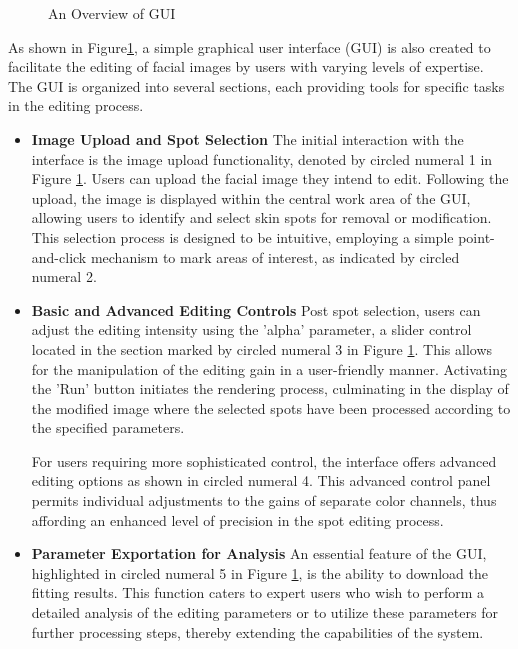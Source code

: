 \begin{spacing}{1.5}
\begin{figure}[t!]
    \caption{An Overview of GUI}
    \label{fig:gui}
\end{figure}
As shown in Figure\ref{fig:gui}, a simple graphical user interface (GUI) is also created to facilitate the editing of facial images by users with varying levels of expertise. The GUI is organized into several sections, each providing tools for specific tasks in the editing process.
\begin{itemize}
    \item \textbf{Image Upload and Spot Selection} The initial interaction with the interface is the image upload functionality, denoted by circled numeral 1 in Figure \ref{fig:gui}. Users can upload the facial image they intend to edit. Following the upload, the image is displayed within the central work area of the GUI, allowing users to identify and select skin spots for removal or modification. This selection process is designed to be intuitive, employing a simple point-and-click mechanism to mark areas of interest, as indicated by circled numeral 2.
    \item \textbf{Basic and Advanced Editing Controls} Post spot selection, users can adjust the editing intensity using the 'alpha' parameter, a slider control located in the section marked by circled numeral 3 in Figure \ref{fig:gui}. This allows for the manipulation of the editing gain in a user-friendly manner. Activating the 'Run' button initiates the rendering process, culminating in the display of the modified image where the selected spots have been processed according to the specified parameters.

    For users requiring more sophisticated control, the interface offers advanced editing options as shown in circled numeral 4. This advanced control panel permits individual adjustments to the gains of separate color channels, thus affording an enhanced level of precision in the spot editing process.
    \item \textbf{Parameter Exportation for Analysis} An essential feature of the GUI, highlighted in circled numeral 5 in Figure \ref{fig:gui}, is the ability to download the fitting results. This function caters to expert users who wish to perform a detailed analysis of the editing parameters or to utilize these parameters for further processing steps, thereby extending the capabilities of the system.
\end{itemize}
\end{spacing}
\newpage
